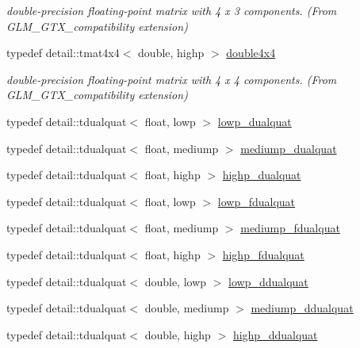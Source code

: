 \begin{CompactItemize}
\begin{CompactList}\small\item\em double-precision floating-point matrix with 4 x 3 components. (From GLM\_\-GTX\_\-compatibility extension) \item\end{CompactList}\item 
\hypertarget{group__gtx__compatibility_g95e88bfe8dea34a6d4b30b1029c3e2da}{
typedef detail::tmat4x4$<$ double, highp $>$ \hyperlink{group__gtx__compatibility_g95e88bfe8dea34a6d4b30b1029c3e2da}{double4x4}}
\label{group__gtx__compatibility_g95e88bfe8dea34a6d4b30b1029c3e2da}

\begin{CompactList}\small\item\em double-precision floating-point matrix with 4 x 4 components. (From GLM\_\-GTX\_\-compatibility extension) \item\end{CompactList}\item 
typedef detail::tdualquat$<$ float, lowp $>$ \hyperlink{group__gtc__dual__quaternion_ge1772179edc60f4e8b46c8772eeeccee}{lowp\_\-dualquat}
\item 
typedef detail::tdualquat$<$ float, mediump $>$ \hyperlink{group__gtc__dual__quaternion_g71fc1c10a382330c1fee55ce29703405}{mediump\_\-dualquat}
\item 
typedef detail::tdualquat$<$ float, highp $>$ \hyperlink{group__gtc__dual__quaternion_gf3a01deb502f53ca555ee1d45e6d6776}{highp\_\-dualquat}
\item 
typedef detail::tdualquat$<$ float, lowp $>$ \hyperlink{group__gtc__dual__quaternion_ge62c636c63c9eb3c1ea6d10f4b7d7c81}{lowp\_\-fdualquat}
\item 
typedef detail::tdualquat$<$ float, mediump $>$ \hyperlink{group__gtc__dual__quaternion_gb211d24786158490e57dfa57d7744f71}{mediump\_\-fdualquat}
\item 
typedef detail::tdualquat$<$ float, highp $>$ \hyperlink{group__gtc__dual__quaternion_g2ed3283c09d3ffaf52a0e0a4b248eab6}{highp\_\-fdualquat}
\item 
typedef detail::tdualquat$<$ double, lowp $>$ \hyperlink{group__gtc__dual__quaternion_g29461fddd543ffdf65a199fc28c42458}{lowp\_\-ddualquat}
\item 
typedef detail::tdualquat$<$ double, mediump $>$ \hyperlink{group__gtc__dual__quaternion_g62d8cbf30e2afd0b1044204268a69066}{mediump\_\-ddualquat}
\item 
typedef detail::tdualquat$<$ double, highp $>$ \hyperlink{group__gtc__dual__quaternion_g61b654c21f080135aedcf23461eb1037}{highp\_\-ddualquat}

\end{CompactItemize}
